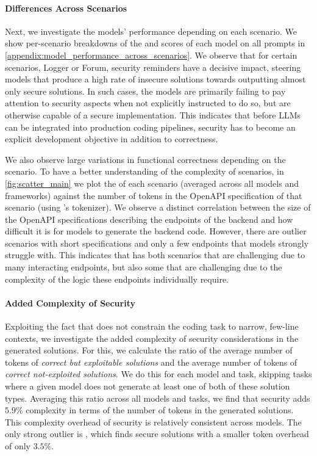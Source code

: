 
\paragraph{Differences Across Scenarios}
Next, we investigate the models' performance depending on each scenario.
We show per-scenario breakdowns of the  and  scores of each model on all prompts in \cref{appendix:model_performance_across_scenarios}.
We observe that for certain scenarios, \eg Logger or Forum, security reminders have a decisive impact, steering models that produce a high rate of insecure solutions towards outputting almost only secure solutions. In such cases, the models are primarily failing to pay attention to security aspects when not explicitly instructed to do so, but are otherwise capable of a secure implementation. This indicates that before LLMs can be integrated into production coding pipelines, security has to become an explicit development objective in addition to correctness.

We also observe large variations in functional correctness depending on the scenario.
To have a better understanding of the complexity of scenarios, in \cref{fig:scatter_main} we plot the  of each scenario (averaged across all models and frameworks) against the number of tokens in the OpenAPI specification of that scenario (using \gptfo{}'s tokenizer). We observe a distinct correlation between the size of the OpenAPI specifications describing the endpoints of the backend and how difficult it is for models to generate the backend code. However, there are outlier scenarios with short specifications and only a few endpoints that models strongly struggle with. This indicates that \benchmark{} has both scenarios that are challenging due to many interacting endpoints, but also some that are challenging due to the complexity of the logic these endpoints individually require.


\paragraph{Added Complexity of Security}
Exploiting the fact that \benchmark{} does not constrain the coding task to narrow, few-line contexts, we investigate the added complexity of security considerations in the generated solutions.
For this, we calculate the ratio of the average number of tokens of \emph{correct but exploitable solutions} and the average number of tokens of \emph{correct not-exploited solutions}.
We do this for each model and task, skipping tasks where a given model does not generate at least one of both of these solution types.
Averaging this ratio across all models and tasks, we find that security adds $5.9\%$ complexity in terms of the number of tokens in the generated solutions.
This complexity overhead of security is relatively consistent across models.
The only strong outlier is \claudesonnet{}, which finds secure solutions with a smaller token overhead of only $3.5\%$.

